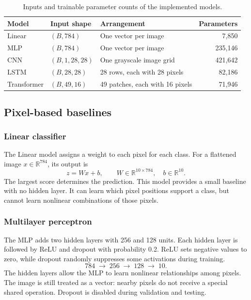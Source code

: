 \begin{table}[h]
\centering
\caption{Inputs and trainable parameter counts of the implemented models.}
\label{tab:fresh_inputs}
\begin{tabularx}{\linewidth}{l l X r}
\toprule
Model & Input shape & Arrangement & Parameters\\
\midrule
Linear & $(B,784)$ & One vector per image & 7,850\\
MLP & $(B,784)$ & One vector per image & 235,146\\
CNN & $(B,1,28,28)$ & One grayscale image grid & 421,642\\
LSTM & $(B,28,28)$ & 28 rows, each with 28 pixels & 82,186\\
Transformer & $(B,49,16)$ & 49 patches, each with 16 pixels & 71,946\\
\bottomrule
\end{tabularx}
\end{table}

\subsection{Pixel-based baselines}
\subsubsection{Linear classifier}
The Linear model assigns a weight to each pixel for each class. For a flattened
image $x\in\mathbb{R}^{784}$, its output is
\[
z=Wx+b,\qquad W\in\mathbb{R}^{10\times784},\quad b\in\mathbb{R}^{10}.
\]
The largest score determines the prediction. This model provides a small
baseline with no hidden layer. It can learn which pixel positions support a
class, but cannot learn nonlinear combinations of those pixels.

\subsubsection{Multilayer perceptron}
The MLP adds two hidden layers with 256 and 128 units. Each hidden layer is
followed by ReLU and dropout with probability 0.2. ReLU sets negative values to
zero, while dropout randomly suppresses some activations during training.
\[
784 \;\longrightarrow\; 256 \;\longrightarrow\; 128
\;\longrightarrow\; 10.
\]
The hidden layers allow the MLP to learn nonlinear relationships among pixels.
The image is still treated as a vector: nearby pixels do not receive a special
shared operation. Dropout is disabled during validation and testing.

